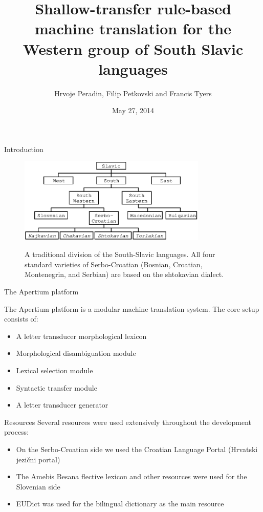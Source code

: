 \documentclass{beamer}
\title{Shallow-transfer rule-based machine translation for the Western group of South Slavic languages}
\author{
	Hrvoje Peradin, Filip Petkovski and Francis Tyers
}
\date{May 27, 2014}
\begin{document}
\begin{frame}
  \titlepage
\end{frame}
\begin{frame}{Introduction}

\begin{center}
	\begin{figure}
	\includegraphics[width=0.8\textwidth]{images/chart.eps}
	\label{fig:1}
	\caption{A traditional division of the South-Slavic languages. All four standard varieties of Serbo-Croatian (Bosnian, Croatian,
Montenegrin, and Serbian) are based on the shtokavian dialect.}
	\end{figure}
\end{center}
\end{frame}

\begin{frame}{The Apertium platform}

The Apertium platform is a modular machine translation system.
The core setup consists of:
\begin{itemize}
\item A letter transducer morphological lexicon
\item Morphological disambiguation module
\item Lexical selection module
\item Syntactic transfer module
\item A letter transducer generator
\end{itemize}
\end{frame}

\begin{frame}{Resources}
Several resources were used extensively throughout the development process:
\begin{itemize}
\item On the Serbo-Croatian side we used the Croatian Language Portal (Hrvatski jezi\v{c}ni portal)
\item The Amebis Besana flective lexicon and other resources were used for the Slovenian side
\item EUDict was used for the bilingual dictionary as the main resource

\end{itemize}
\end{frame}
\end{document}
